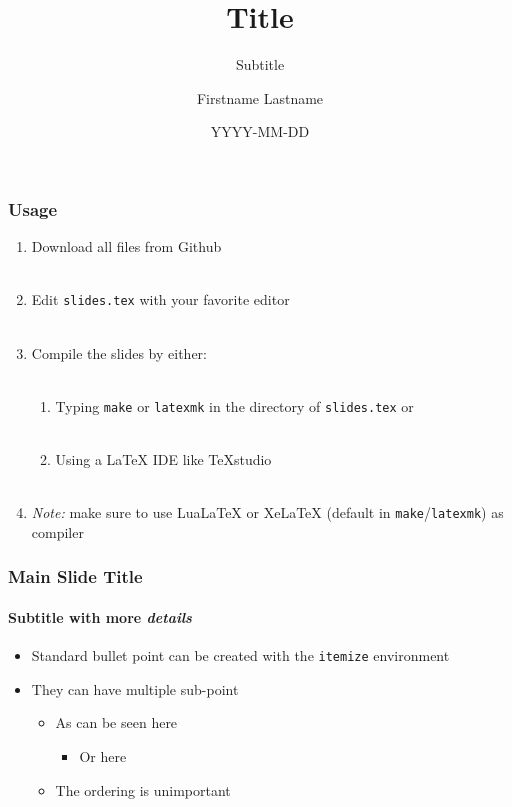 \documentclass[aspectratio=1610]{beamer}
\title{Title}
\subtitle{Subtitle}
\author{Firstname Lastname}
\date{YYYY-MM-DD}
\institute{Center}
\begin{document}
\maketitle

\begin{frame}
    \frametitle{Usage}

    \begin{enumerate}
        \item Download all files from Github\\~
        \item Edit \texttt{slides.tex} with your favorite editor\\~
        \item Compile the slides by either:\\~
        \begin{enumerate}
            \item Typing \texttt{make} or \texttt{latexmk} in the directory of \texttt{slides.tex} or\\~
            \item Using a LaTeX IDE like TeXstudio\\~
        \end{enumerate}
        \item \emph{Note:} make sure to use LuaLaTeX or XeLaTeX (default in \texttt{make}/\texttt{latexmk}) as compiler
    \end{enumerate}
\end{frame}

\begin{frame}
    \frametitle{Main Slide Title}
    \framesubtitle{\textbf{Subtitle} with more \emph{details}}

    \begin{itemize}
        \item Standard bullet point can be created with the \texttt{itemize} environment
        \item They can have multiple sub-point
        \begin{itemize}
            \item As can be seen here
            \begin{itemize}
                \item Or here
            \end{itemize}
            \item The ordering is unimportant
        \end{itemize}
    \end{itemize}
\end{frame}
\end{document}
